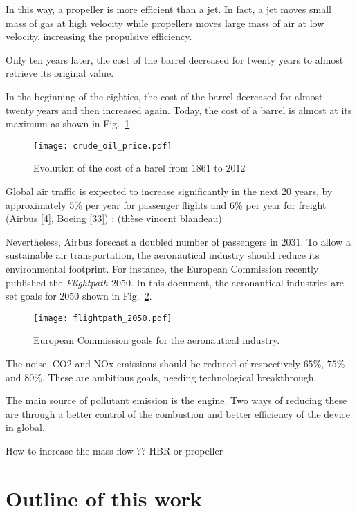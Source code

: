In this way, a propeller is more efficient than a jet. In fact, a jet 
moves small mass of gas at high velocity while propellers moves 
large mass of air at low velocity, increasing the propulsive efficiency.

Only ten years later, the cost of 
the barrel decreased for twenty years to almost retrieve its original
value. 

In the beginning of the eighties, the cost of 
the barrel decreased for almost twenty years and then increased again.
Today, the cost of a barrel is almost at its maximum as shown
in Fig.~\ref{fig:crude_oil_price}.
\begin{figure}[htp]
  \centering
  \texttt{[image: crude\_oil\_price.pdf]}
  \caption{Evolution of the cost of a barel from $1861$ to $2012$ \cite{bpreview2013}}
  \label{fig:crude_oil_price}
\end{figure}

Global air traffic is expected to increase significantly in the next 20 years, 
by approximately 5\% per year for passenger flights and 6\% 
per year for freight (Airbus [4], Boeing [33]) : (thèse vincent blandeau)


Nevertheless, Airbus forecast a doubled number of passengers in
$2031$. To allow a sustainable air transportation, the aeronautical
industry should reduce its environmental footprint. For instance,
the European Commission recently published the \emph{Flightpath $2050$}.
In this document, the aeronautical industries are set goals for $2050$
shown in Fig.~\ref{fig:flightpath_2050}.
\begin{figure}[htp]
  \centering
  \texttt{[image: flightpath\_2050.pdf]}
  \caption{European Commission goals for the aeronautical industry. }
  \label{fig:flightpath_2050}
\end{figure}
The noise, CO2 and NOx emissions should be reduced of 
respectively $65\%$, $75\%$ and $80\%$.
These are ambitious goals, needing technological breakthrough.

The main source of pollutant emission is the engine. Two ways of reducing
these are through a better control of the combustion and better
efficiency of the device in global.

How to increase the mass-flow ??
HBR or propeller




\section*{Outline of this work}
\label{sec:outline_of_this_work}

